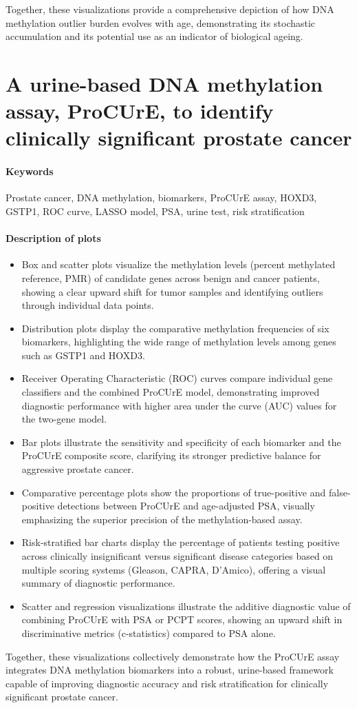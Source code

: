 \documentclass[10pt]{extarticle}
\begin{document}
Together, these visualizations provide a comprehensive depiction of how DNA methylation outlier burden evolves with age, demonstrating its stochastic accumulation and its potential use as an indicator of biological ageing.






\section{A urine-based DNA methylation assay, ProCUrE, to identify clinically significant prostate cancer}

\paragraph{Keywords}
Prostate cancer, DNA methylation, biomarkers, ProCUrE assay, HOXD3, GSTP1, ROC curve, LASSO model, PSA, urine test, risk stratification \cite{zhao2018procure}

\paragraph{Description of plots}
\begin{itemize}[label=-]
  \item Box and scatter plots visualize the methylation levels (percent methylated reference, PMR) of candidate genes across benign and cancer patients, showing a clear upward shift for tumor samples and identifying outliers through individual data points.  
  \item Distribution plots display the comparative methylation frequencies of six biomarkers, highlighting the wide range of methylation levels among genes such as GSTP1 and HOXD3.  
  \item Receiver Operating Characteristic (ROC) curves compare individual gene classifiers and the combined ProCUrE model, demonstrating improved diagnostic performance with higher area under the curve (AUC) values for the two-gene model.  
  \item Bar plots illustrate the sensitivity and specificity of each biomarker and the ProCUrE composite score, clarifying its stronger predictive balance for aggressive prostate cancer.  
  \item Comparative percentage plots show the proportions of true-positive and false-positive detections between ProCUrE and age-adjusted PSA, visually emphasizing the superior precision of the methylation-based assay.  
  \item Risk-stratified bar charts display the percentage of patients testing positive across clinically insignificant versus significant disease categories based on multiple scoring systems (Gleason, CAPRA, D’Amico), offering a visual summary of diagnostic performance.  
  \item Scatter and regression visualizations illustrate the additive diagnostic value of combining ProCUrE with PSA or PCPT scores, showing an upward shift in discriminative metrics (c-statistics) compared to PSA alone.  
\end{itemize}

Together, these visualizations collectively demonstrate how the ProCUrE assay integrates DNA methylation biomarkers into a robust, urine-based framework capable of improving diagnostic accuracy and risk stratification for clinically significant prostate cancer.





\printbibliography
\end{document}
